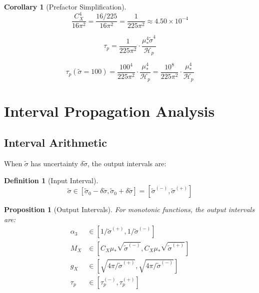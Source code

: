 \documentclass[11pt,letterpaper]{article}
\newtheorem{proposition}[theorem]{Proposition}
\newtheorem{corollary}[theorem]{Corollary}
\newtheorem{definition}[theorem]{Definition}
\newcommand{\st}{\tilde{\sigma}}
\newcommand{\Hp}{\mathcal{H}_p}
\begin{document}
\begin{corollary}[Prefactor Simplification]
\label{cor:prefactor}
\begin{equation}
\frac{C_X^4}{16\pi^2} = \frac{16/225}{16\pi^2} = \frac{1}{225\pi^2} \approx 4.50 \times 10^{-4}
\label{eq:prefactor-simplify}
\end{equation}
\end{corollary}

\begin{equation}
\tau_p = \frac{1}{225\pi^2} \cdot \frac{\mu_*^4 \st^4}{\Hp}
\label{eq:taup-simplified}
\end{equation}

\begin{equation}
\tau_p(\st = 100) = \frac{100^4}{225\pi^2} \cdot \frac{\mu_*^4}{\Hp} = \frac{10^8}{225\pi^2} \cdot \frac{\mu_*^4}{\Hp}
\label{eq:taup-st100}
\end{equation}

\section{Interval Propagation Analysis}
\label{app:interval}

\subsection{Interval Arithmetic}
\label{app:interval-arithmetic}

When $\st$ has uncertainty $\delta\st$, the output intervals are:

\begin{definition}[Input Interval]
\label{def:input-interval}
\begin{equation}
\st \in [\st_0 - \delta\st, \st_0 + \delta\st] = [\st^{(-)}, \st^{(+)}]
\label{eq:input-interval}
\end{equation}
\end{definition}

\begin{proposition}[Output Intervals]
\label{prop:output-intervals}
For monotonic functions, the output intervals are:
\begin{align}
\alpha_3 &\in [1/\st^{(+)}, 1/\st^{(-)}] \label{eq:alpha3-interval} \\
M_X &\in [C_X \mu_* \sqrt{\st^{(-)}}, C_X \mu_* \sqrt{\st^{(+)}}] \label{eq:mx-interval} \\
g_X &\in [\sqrt{4\pi/\st^{(+)}}, \sqrt{4\pi/\st^{(-)}}] \label{eq:gx-interval} \\
\tau_p &\in [\tau_p^{(-)}, \tau_p^{(+)}] \label{eq:taup-interval-app}
\end{align}
\end{proposition}
\end{document}

